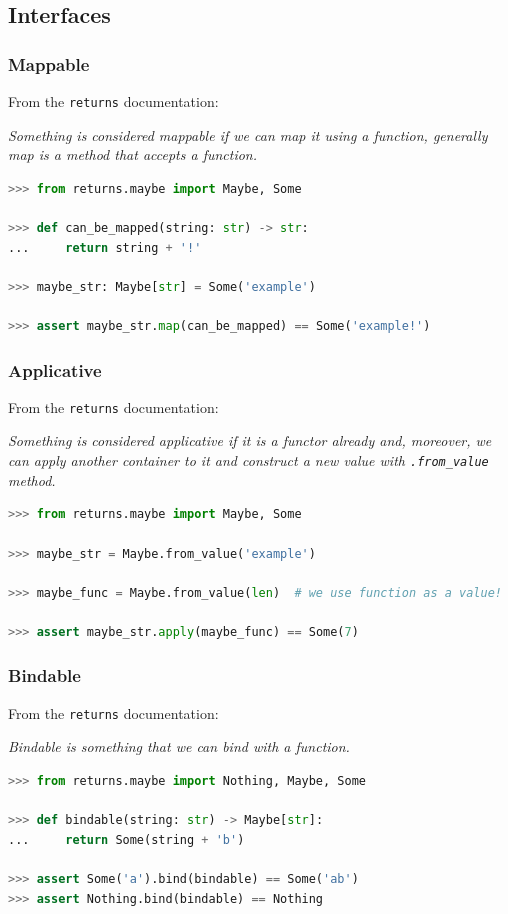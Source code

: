 \documentclass[envcountsect,10pt]{beamer}
\begin{document}
\subsection{Interfaces}

\begin{frame}[fragile]
    \frametitle{Mappable}

    From the \texttt{returns} documentation:

    \textit{Something is considered mappable if we can map it using a function, generally map is a method that accepts a function.}

    \begin{lstlisting}[language=Python]
>>> from returns.maybe import Maybe, Some

>>> def can_be_mapped(string: str) -> str:
...     return string + '!'

>>> maybe_str: Maybe[str] = Some('example')

>>> assert maybe_str.map(can_be_mapped) == Some('example!')
    \end{lstlisting}
\end{frame}

\begin{frame}[fragile]
    \frametitle{Applicative}

    From the \texttt{returns} documentation:

    \textit{Something is considered applicative if it is a functor already and, moreover, we can apply another container to it and construct a new value with \texttt{.from\_value} method.}

    \begin{lstlisting}[language=Python]
>>> from returns.maybe import Maybe, Some

>>> maybe_str = Maybe.from_value('example')

>>> maybe_func = Maybe.from_value(len)  # we use function as a value!

>>> assert maybe_str.apply(maybe_func) == Some(7)
    \end{lstlisting}
\end{frame}

\begin{frame}[fragile]
    \frametitle{Bindable}

    From the \texttt{returns} documentation:

    \textit{Bindable is something that we can bind with a function.}

    \begin{lstlisting}[language=Python]
>>> from returns.maybe import Nothing, Maybe, Some

>>> def bindable(string: str) -> Maybe[str]:
...     return Some(string + 'b')

>>> assert Some('a').bind(bindable) == Some('ab')
>>> assert Nothing.bind(bindable) == Nothing
    \end{lstlisting}
\end{frame}
\end{document}
